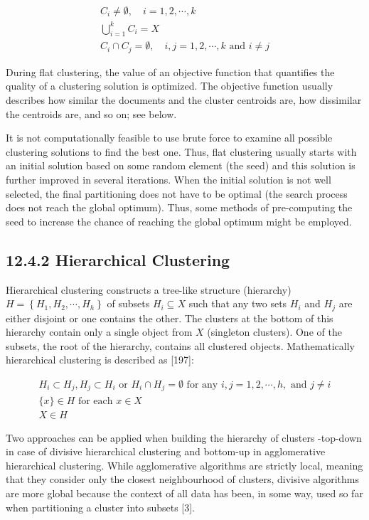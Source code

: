 \documentclass[10pt]{book}
\begin{document}
\begin{gather*}
C_{i} \neq \emptyset, \quad i=1,2, \cdots, k \\
\bigcup_{i=1}^{k} C_{i}=X  \tag{12.12}\\
C_{i} \cap C_{j}=\emptyset, \quad i, j=1,2, \cdots, k \text { and } i \neq j
\end{gather*}


During flat clustering, the value of an objective function that quantifies the quality of a clustering solution is optimized. The objective function usually describes how similar the documents and the cluster centroids are, how dissimilar the centroids are, and so on; see below.

It is not computationally feasible to use brute force to examine all possible clustering solutions to find the best one. Thus, flat clustering usually starts with an initial solution based on some random element (the seed) and this solution is further improved in several iterations. When the initial solution is not well selected, the final partitioning does not have to be optimal (the search process does not reach the global optimum). Thus, some methods of pre-computing the seed to increase the chance of reaching the global optimum might be employed.

\subsection*{12.4.2 Hierarchical Clustering}
Hierarchical clustering constructs a tree-like structure (hierarchy) $H= \left\{H_{1}, H_{2}, \cdots, H_{h}\right\}$ of subsets $H_{i} \subseteq X$ such that any two sets $H_{i}$ and $H_{j}$ are either disjoint or one contains the other. The clusters at the bottom of this hierarchy contain only a single object from $X$ (singleton clusters). One of the subsets, the root of the hierarchy, contains all clustered objects. Mathematically hierarchical clustering is described as [197]:


\begin{gather*}
H_{i} \subset H_{j}, H_{j} \subset H_{i} \text { or } H_{i} \cap H_{j}=\emptyset \text { for any } i, j=1,2, \cdots, h, \text { and } j \neq i \\
\{x\} \in H \text { for each } x \in X  \tag{12.13}\\
X \in H
\end{gather*}


Two approaches can be applied when building the hierarchy of clusters -top-down in case of divisive hierarchical clustering and bottom-up in agglomerative hierarchical clustering. While agglomerative algorithms are strictly local, meaning that they consider only the closest neighbourhood of clusters, divisive algorithms are more global because the context of all data has been, in some way, used so far when partitioning a cluster into subsets [3].
\end{document}
